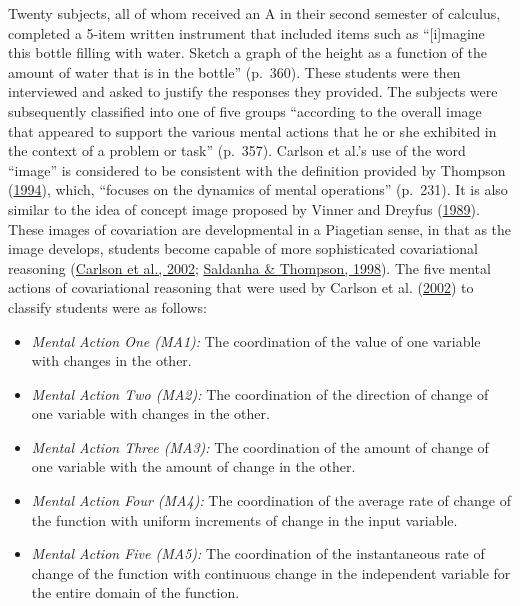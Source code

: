 \documentclass[11pt]{umnthesis}
\begin{document}
Twenty subjects, all of whom received an A in their second semester of calculus, completed a 5-item written instrument that included items such as ``{[}i{]}magine this bottle filling with water. Sketch a graph of the height as a function of the amount of water that is in the bottle'' (p.~360). These students were then interviewed and asked to justify the responses they provided. The subjects were subsequently classified into one of five groups ``according to the overall image that appeared to support the various mental actions that he or she exhibited in the context of a problem or task'' (p.~357). Carlson et al.'s use of the word ``image'' is considered to be consistent with the definition provided by Thompson (\protect\hyperlink{ref-thompson:1994}{1994}), which, ``focuses on the dynamics of mental operations'' (p.~231). It is also similar to the idea of concept image proposed by Vinner and Dreyfus (\protect\hyperlink{ref-vinner:1989}{1989}). These images of covariation are developmental in a Piagetian sense, in that as the image develops, students become capable of more sophisticated covariational reasoning (\protect\hyperlink{ref-carlson:2002}{Carlson et al., 2002}; \protect\hyperlink{ref-saldanha:1998}{Saldanha \& Thompson, 1998}). The five mental actions of covariational reasoning that were used by Carlson et al. (\protect\hyperlink{ref-carlson:2002}{2002}) to classify students were as follows:

\begin{itemize}
\tightlist
\item
  \emph{Mental Action One (MA1):} The coordination of the value of one variable with changes in the other.
\item
  \emph{Mental Action Two (MA2):} The coordination of the direction of change of one variable with changes in the other.
\item
  \emph{Mental Action Three (MA3):} The coordination of the amount of change of one variable with the amount of change in the other.
\item
  \emph{Mental Action Four (MA4):} The coordination of the average rate of change of the function with uniform increments of change in the input variable.
\item
  \emph{Mental Action Five (MA5):} The coordination of the instantaneous rate of change of the function with continuous change in the independent variable for the entire domain of the function.
\end{itemize}
\end{document}
